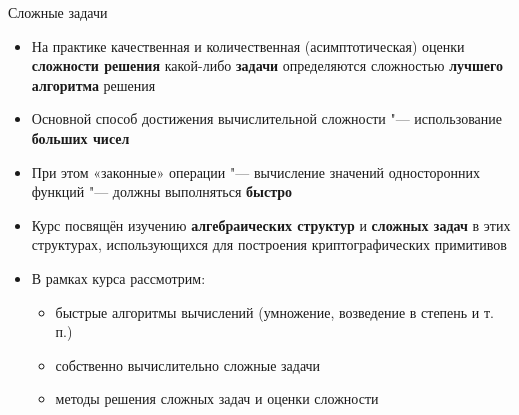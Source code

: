 \documentclass{ca-slides}
\begin{document}
\begin{canvasframe}{Сложные задачи}
  \begin{itemize}
    \item На практике качественная и количественная (асимптотическая) оценки
      \textbf{сложности решения} какой-либо \textbf{задачи} определяются сложностью
      \textbf{лучшего алгоритма} решения
    \item Основной способ достижения вычислительной сложности "--- использование
      \textbf{больших чисел}
    \item При этом «законные» операции "--- вычисление значений односторонних функций "---
      должны выполняться \textbf{быстро}
    \item Курс посвящён изучению \textbf{алгебраических структур} и \textbf{сложных задач}
      в этих структурах, использующихся для построения криптографических примитивов
    \item В рамках курса рассмотрим:
    \begin{itemize}
      \item быстрые алгоритмы вычислений (умножение, возведение в степень и т.\,п.)
      \item собственно вычислительно сложные задачи
      \item методы решения сложных задач и оценки сложности
    \end{itemize}
  \end{itemize}
\end{canvasframe}
\end{document}
